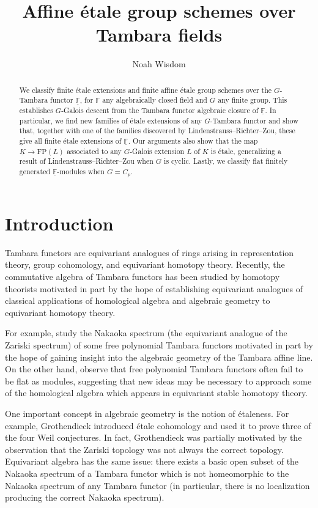 \documentclass[11pt,dvipsnames]{amsart}
\author[N. Wisdom]{Noah Wisdom}
\title{Affine \'{e}tale group schemes over Tambara fields}
\date{}
\theoremstyle{BoldRemark}
\begin{document}
\begin{abstract}
    We classify finite \'{e}tale extensions and finite affine \'{e}tale group schemes over the $G$-Tambara functor $\underline{\mathbb{F}}$, for $\mathbb{F}$ any algebraically closed field and $G$ any finite group. This establishes $G$-Galois descent from the Tambara functor algebraic closure of $\underline{\mathbb{F}}$. In particular, we find new families of \'{e}tale extensions of any $G$-Tambara functor and show that, together with one of the families discovered by Lindenstrauss--Richter--Zou, these give all finite \'{e}tale extensions of $\underline{\mathbb{F}}$. Our arguments also show that the map $\underline{K} \rightarrow \mathrm{FP}(L)$ associated to any $G$-Galois extension $L$ of $K$ is \'{e}tale, generalizing a result of Lindenstrauss--Richter--Zou when $G$ is cyclic. Lastly, we classify flat finitely generated $\underline{\mathbb{F}}$-modules when $G = C_p$.
\end{abstract}

\maketitle
\tableofcontents

\section{Introduction}

Tambara functors are equivariant analogues of rings arising in representation theory, group cohomology, and equivariant homotopy theory. Recently, the commutative algebra of Tambara functors has been studied by homotopy theorists motivated in part by the hope of establishing equivariant analogues of classical applications of homological algebra and algebraic geometry to equivariant homotopy theory.

For example, \cite{4DS} study the Nakaoka spectrum (the equivariant analogue of the Zariski spectrum) of some free polynomial Tambara functors motivated in part by the hope of gaining insight into the algebraic geometry of the Tambara affine line. On the other hand, \cite{HMQ23} observe that free polynomial Tambara functors often fail to be flat as modules, suggesting that new ideas may be necessary to approach some of the homological algebra which appears in equivariant stable homotopy theory.

One important concept in algebraic geometry is the notion of \'{e}taleness. For example, Grothendieck introduced \'{e}tale cohomology and used it to prove three of the four Weil conjectures. In fact, Grothendieck was partially motivated by the observation that the Zariski topology was not always the correct topology. Equivariant algebra has the same issue: there exists a basic open subset of the Nakaoka spectrum of a Tambara functor which is not homeomorphic to the Nakaoka spectrum of any Tambara functor (in particular, there is no localization producing the correct Nakaoka spectrum).
\end{document}
